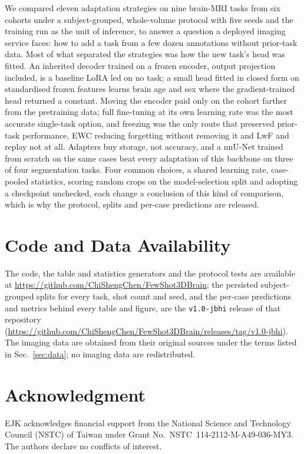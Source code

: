 \iffull\documentclass[journal]{IEEEtran}\else\documentclass[journal,twoside,web]{ieeecolor}\usepackage{generic}\fi
\begin{document}
\else
We compared eleven adaptation strategies on nine brain-MRI tasks from six cohorts under a subject-grouped, whole-volume protocol with five seeds and the training run as the unit of inference, to answer a question a deployed imaging service faces: how to add a task from a few dozen annotations without prior-task data. Most of what separated the strategies was how the new task's head was fitted. An inherited decoder trained on a frozen encoder, output projection included, is a baseline LoRA led on no task; a small head fitted in closed form on standardised frozen features learns brain age and sex where the gradient-trained head returned a constant. Moving the encoder paid only on the cohort farther from the pretraining data; full fine-tuning at its own learning rate was the most accurate single-task option, and freezing was the only route that preserved prior-task performance, EWC reducing forgetting without removing it and LwF and replay not at all. Adapters buy storage, not accuracy, and a nnU-Net trained from scratch on the same cases beat every adaptation of this backbone on three of four segmentation tasks. Four common choices, a shared learning rate, case-pooled statistics, scoring random crops on the model-selection split and adopting a checkpoint unchecked, each change a conclusion of this kind of comparison, which is why the protocol, splits and per-case predictions are released.

\fi  %
\section*{Code and Data Availability}
The code, the table and statistics generators and the protocol tests are available at \url{https://github.com/ChiShengChen/FewShot3DBrain}; the persisted subject-grouped splits for every task, shot count and seed, and the per-case predictions and metrics behind every table and figure, are the \texttt{v1.0-jbhi} release of that repository (\url{https://github.com/ChiShengChen/FewShot3DBrain/releases/tag/v1.0-jbhi}). The imaging data are obtained from their original sources under the terms listed in Sec.~\ref{sec:data}; no imaging data are redistributed.

\section*{Acknowledgment}
EJK acknowledges financial support from the National Science and Technology Council (NSTC) of Taiwan under Grant No.~NSTC~114-2112-M-A49-036-MY3. The authors declare no conflicts of interest.
\end{document}
